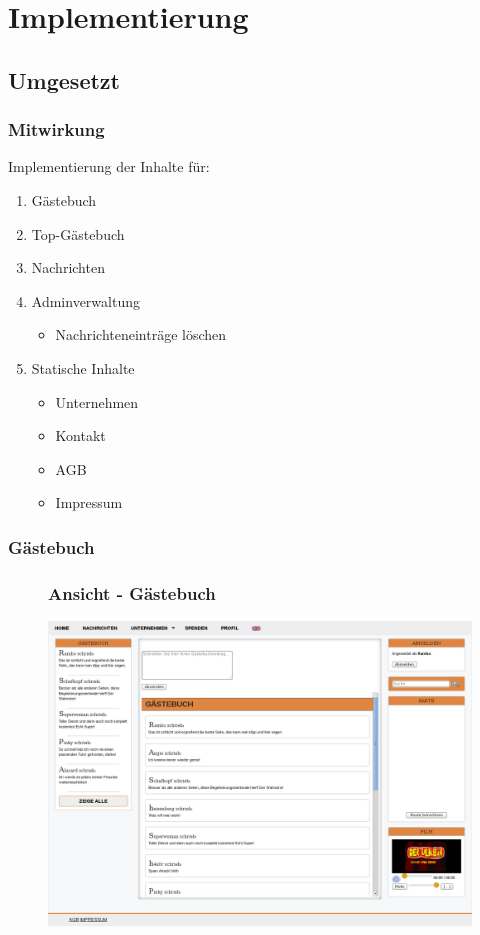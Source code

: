 \section{Implementierung}

\subsection{Umgesetzt}
\begin{frame}
	\frametitle{Mitwirkung}
	
	Implementierung der Inhalte für:
	\begin{enumerate}
		\item Gästebuch
		\item Top-Gästebuch
		\item Nachrichten
		\item Adminverwaltung
		\begin{itemize}
			\item Nachrichteneinträge löschen
		\end{itemize}
		\item Statische Inhalte
		\begin{itemize}
			\item Unternehmen
			\item Kontakt
			\item AGB
			\item Impressum
		\end{itemize}
	\end{enumerate}
\end{frame}

\subsubsection{Gästebuch}

\begin{frame}
\begin{figure}
\frametitle{Ansicht - Gästebuch}
\centering
\includegraphics[width=0.85\linewidth]{./Source/Gaestebuch_logged_in}
\label{fig:Gaestebuch}
\end{figure}


\end{frame}


